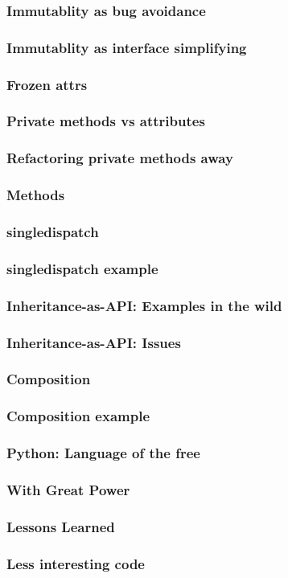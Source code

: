 \begin{frame}[fragile]
\frametitle{Immutablity as bug avoidance}
\end{frame}

\begin{frame}[fragile]
\frametitle{Immutablity as interface simplifying}
\end{frame}

\begin{frame}[fragile]
\frametitle{Frozen attrs}
\end{frame}

\begin{frame}[fragile]
\frametitle{Private methods vs attributes}
\end{frame}

\begin{frame}[fragile]
\frametitle{Refactoring private methods away}
\end{frame}

\begin{frame}[fragile]
\frametitle{Methods}
\end{frame}

\begin{frame}[fragile]
\frametitle{singledispatch}
\end{frame}

\begin{frame}[fragile]
\frametitle{singledispatch example}
\end{frame}

\begin{frame}[fragile]
\frametitle{Inheritance-as-API: Examples in the wild}
\end{frame}

\begin{frame}[fragile]
\frametitle{Inheritance-as-API: Issues}
\end{frame}

\begin{frame}[fragile]
\frametitle{Composition}
\end{frame}

\begin{frame}[fragile]
\frametitle{Composition example}
\end{frame}

\begin{frame}[fragile]
\frametitle{Python: Language of the free}
\end{frame}

\begin{frame}[fragile]
\frametitle{With Great Power}
\end{frame}

\begin{frame}[fragile]
\frametitle{Lessons Learned}
\end{frame}

\begin{frame}[fragile]
\frametitle{Less interesting code}
\end{frame}


